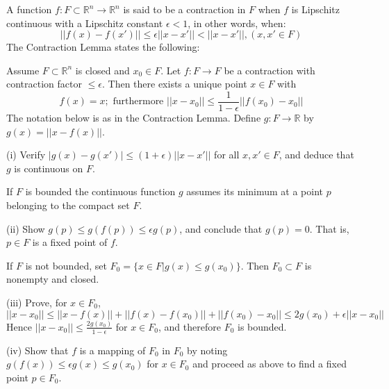 \begin{exercise}{29}
    A function $f: F \subset \mathbb{R}^n \rightarrow \mathbb{R}^n$ is said to be a contraction in $F$ when $f$ is Lipschitz continuous with a Lipschitz constant $\epsilon < 1$, in other words, when:
    $$\lvert \lvert f(x) - f(x') \rvert \rvert \leq \epsilon \lvert \lvert x - x' \rvert \rvert < \lvert \lvert x - x' \rvert \rvert, (x, x' \in F)$$
    The Contraction Lemma states the following:

    Assume $F \subset \mathbb{R}^n$ is closed and $x_0 \in F$.
    Let $f: F \rightarrow F$ be a contraction with contraction factor $\leq \epsilon$.
    Then there exists a unique point $x \in F$ with 
    $$f(x) = x; \text{ furthermore } \lvert \lvert x - x_0 \rvert \rvert \leq \frac{1}{1 - \epsilon}\lvert \lvert f(x_0) - x_0 \rvert \rvert$$
    The notation below is as in the Contraction Lemma.
    Define $g: F \rightarrow \mathbb{R}$ by $g(x) = \lvert \lvert x - f(x) \rvert \rvert$.

    (i) Verify $\lvert g(x) - g(x') \rvert \leq (1 + \epsilon)\lvert \lvert x - x' \rvert \rvert$ for all $x, x' \in F$, and deduce that $g$ is continuous on $F$.

    If $F$ is bounded the continuous function $g$ assumes its minimum at a point $p$ belonging to the compact set $F$.

    (ii) Show $g(p) \leq g(f(p)) \leq \epsilon g(p)$, and conclude that $g(p) = 0$.
    That is, $p \in F$ is a fixed point of $f$.

    If $F$ is not bounded, set $F_0 = \{ x \in F \lvert g(x) \leq g(x_0) \}$.
    Then $F_0 \subset F$ is nonempty and closed.

    (iii) Prove, for $x \in F_0$,
    $$\lvert \lvert x - x_0 \rvert \rvert \leq \lvert \lvert x - f(x) \rvert \rvert + \lvert \lvert f(x) - f(x_0) \rvert \rvert + \lvert \lvert f(x_0) - x_0 \rvert \rvert \leq 2g(x_0) + \epsilon \lvert \lvert x - x_0 \rvert \rvert$$ 
    Hence $\lvert \lvert x - x_0 \rvert \rvert \leq \frac{2g(x_0)}{1 - \epsilon}$ for $x \in F_0$, and therefore $F_0$ is bounded.

    (iv) Show that $f$ is a mapping of $F_0$ in $F_0$ by noting $g(f(x)) \leq \epsilon g(x) \leq g(x_0)$ for $x \in F_0$ and proceed as above to find a fixed point $p \in F_0$.
\end{exercise}

